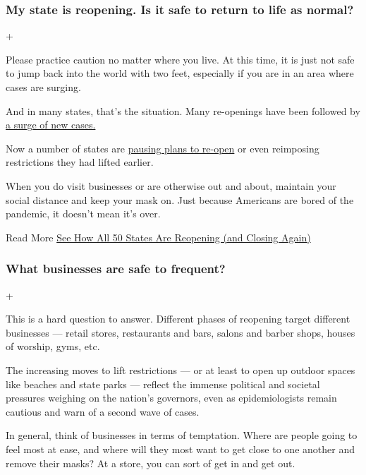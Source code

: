 \hypertarget{my-state-is-reopening-is-it-safe-to-return-to-life-as-normal}{%
\subsubsection{My state is reopening. Is it safe to return to life as
normal?}\label{my-state-is-reopening-is-it-safe-to-return-to-life-as-normal}}

+

Please practice caution no matter where you live. At this time, it is
just not safe to jump back into the world with two feet, especially if
you are in an area where cases are surging.

And in many states, that's the situation. Many re-openings have been
followed by
\href{https://www.nytimes3xbfgragh.onion/interactive/2020/07/09/us/coronavirus-cases-reopening-trends.html}{a
surge of new cases.}

Now a number of states are
\href{https://www.nytimes3xbfgragh.onion/2020/06/25/us/texas-coronavirus-cases-reopening-Greg-Abbott.html}{pausing
plans to re-open} or even reimposing restrictions they had lifted
earlier.

When you do visit businesses or are otherwise out and about, maintain
your social distance and keep your mask on. Just because Americans are
bored of the pandemic, it doesn't mean it's over.

 Read More
\href{https://www.nytimes3xbfgragh.onion/interactive/2020/us/states-reopen-map-coronavirus.html}{See
How All 50 States Are Reopening (and Closing Again)}

\hypertarget{what-businesses-are-safe-to-frequent}{%
\subsubsection{What businesses are safe to
frequent?}\label{what-businesses-are-safe-to-frequent}}

+

This is a hard question to answer. Different phases of reopening target
different businesses --- retail stores, restaurants and bars, salons and
barber shops, houses of worship, gyms, etc.

The increasing moves to lift restrictions --- or at least to open up
outdoor spaces like beaches and state parks --- reflect the immense
political and societal pressures weighing on the nation's governors,
even as epidemiologists remain cautious and warn of a second wave of
cases.

In general, think of businesses in terms of temptation. Where are people
going to feel most at ease, and where will they most want to get close
to one another and remove their masks? At a store, you can sort of get
in and get out.

